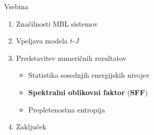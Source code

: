 \documentclass[1pt]{beamer}
\begin{document}
\begin{frame}{Vsebina}
\begin{enumerate}
	\item Značilnosti MBL sistemov\vspace{2.5mm}
	\item Vpeljava modela $t$-$J$\vspace{5mm}

	\item Predstavitev numeričnih rezultatov\vspace{2.5mm}
	\begin{itemize}
		\item Statistika sosednjih energijskih nivojev
		\item \textbf{Spektralni oblikovni faktor} (\textbf{SFF})
		\item Prepletenostna entropija 
		\vspace{5mm}
	\end{itemize}
	\item Zaključek
\end{enumerate}
\end{frame}
\end{document}

